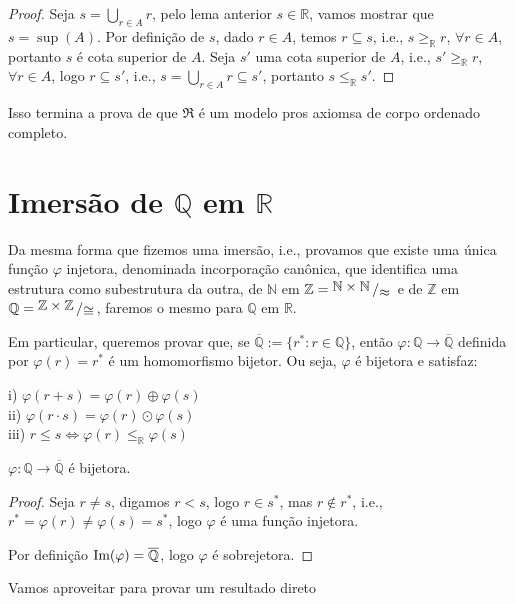 \documentclass[11pt]{article}
\newcommand{\mf}[1]{\mathfrak{#1}}
\newcommand{\mbb}[1]{\mathbb{#1}}
\newcommand{\ol}[1]{\overline{#1}}
\newcommand{\im}[1]{\text{\normalfont Im}(#1)}
\newcommand{\bigslant}[2]{{\raisebox{.2em}{$#1$}\left/\raisebox{-.2em}{$#2$}\right.}}
\newcommand{\leqr}{\leq_\mbb{R}}
\newcommand{\geqr}{\geq_\mbb{R}}
\begin{document}
\begin{proof}
    Seja $s=\bigcup_{r\in A}r$, pelo lema anterior $s\in\mbb{R}$, vamos mostrar que $s=\sup(A)$. Por definição de $s$, dado $r\in A$, temos $r\subseteq s$, i.e., $s\geqr r$, $\forall r\in A$, portanto $s$ é cota superior de $A$. Seja $s'$ uma cota superior de $A$, i.e., $s'\geqr r$, $\forall r\in A$, logo $r\subseteq s'$, i.e., $s=\bigcup_{r\in A}r\subseteq s'$, portanto $s\leqr s'$.
\end{proof}

Isso termina a prova de que $\mf{R}$ é um modelo pros axiomsa de corpo ordenado completo.

\section{Imersão de $\mbb{Q}$ em $\mbb{R}$}

Da mesma forma que fizemos uma imersão, i.e., provamos que existe uma única função $\varphi$ injetora, denominada incorporação canônica, que identifica uma estrutura como subestrutura da outra, de $\mbb{N}$ em $\mbb{Z}=\bigslant{\mbb{N}\times\mbb{N}}{\approx}$ e de $\mbb{Z}$ em $\mbb{Q}=\bigslant{\mbb{Z}\times\mbb{Z}}{\cong}$, faremos o mesmo para $\mbb{Q}$ em $\mbb{R}$.

Em particular, queremos provar que, se $\ol{\mbb{Q}}:=\{r^*:r\in\mbb{Q}\}$, então $\varphi:\mbb{Q}\to\ol{\mbb{Q}}$ definida por $\varphi(r)=r^*$ é um homomorfismo bijetor. Ou seja, $\varphi$ é bijetora e satisfaz:

i) $\varphi(r+s)=\varphi(r)\oplus\varphi(s)$\\
ii) $\varphi(r\cdot s)=\varphi(r)\odot\varphi(s)$\\
iii) $r\leq s\iff \varphi(r)\leqr\varphi(s)$

\begin{shaded}
\begin{theorem}
    $\varphi:\mbb{Q}\to\ol{\mbb{Q}}$ é bijetora.
\end{theorem}
\end{shaded}

\begin{proof}
    Seja $r\neq s$, digamos $r<s$, logo $r\in s^*$, mas $r\notin r^*$, i.e., $r^*=\varphi(r)\neq\varphi(s)=s^*$, logo $\varphi$ é uma função injetora.

    Por definição $\im{\varphi}=\ol{\mbb{Q}}$, logo $\varphi$ é sobrejetora.
\end{proof}

Vamos aproveitar para provar um resultado direto
\end{document}
